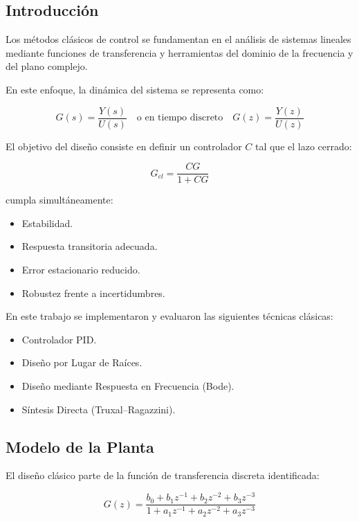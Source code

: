\subsection{Introducción}

Los métodos clásicos de control se fundamentan en el análisis de sistemas lineales mediante funciones de transferencia y herramientas del dominio de la frecuencia y del plano complejo.

En este enfoque, la dinámica del sistema se representa como:

\[
G(s)=\frac{Y(s)}{U(s)}
\quad \text{o en tiempo discreto} \quad
G(z)=\frac{Y(z)}{U(z)}
\]

El objetivo del diseño consiste en definir un controlador \(C\) tal que el lazo cerrado:

\[
G_{cl}=\frac{C G}{1+CG}
\]

cumpla simultáneamente:

\begin{itemize}
	\item Estabilidad.
	\item Respuesta transitoria adecuada.
	\item Error estacionario reducido.
	\item Robustez frente a incertidumbres.
\end{itemize}

En este trabajo se implementaron y evaluaron las siguientes técnicas clásicas:

\begin{itemize}
	\item Controlador PID.
	\item Diseño por Lugar de Raíces.
	\item Diseño mediante Respuesta en Frecuencia (Bode).
	\item Síntesis Directa (Truxal--Ragazzini).
\end{itemize}

\subsection{Modelo de la Planta}

El diseño clásico parte de la función de transferencia discreta identificada:

\[
G(z) = \frac{
	b_0 + b_1 z^{-1} + b_2 z^{-2} + b_3 z^{-3}
}{
	1 + a_1 z^{-1} + a_2 z^{-2} + a_3 z^{-3}
}
\]

